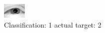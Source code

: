 \begin{figure}[h!]
\begin{center}
\includegraphics[width=0.60\columnwidth]{figures/ID2245_class_1_target_2.png}
\end{center}
\caption{ Classification: 1 actual target: 2}
\label{fig:ID2245_class_1_target_2}
\end{figure}
